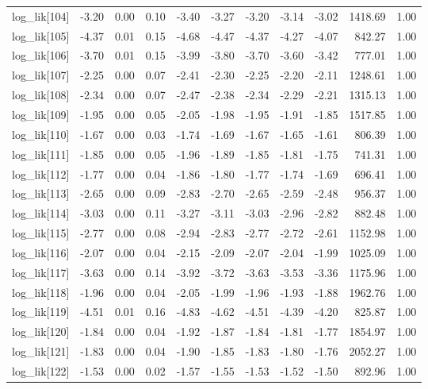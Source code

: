 \begin{table}[ht]
\begin{tabular}{rrrrrrrrrrr}
  log\_lik[104] & -3.20 & 0.00 & 0.10 & -3.40 & -3.27 & -3.20 & -3.14 & -3.02 & 1418.69 & 1.00 \\ 
  log\_lik[105] & -4.37 & 0.01 & 0.15 & -4.68 & -4.47 & -4.37 & -4.27 & -4.07 & 842.27 & 1.00 \\ 
  log\_lik[106] & -3.70 & 0.01 & 0.15 & -3.99 & -3.80 & -3.70 & -3.60 & -3.42 & 777.01 & 1.00 \\ 
  log\_lik[107] & -2.25 & 0.00 & 0.07 & -2.41 & -2.30 & -2.25 & -2.20 & -2.11 & 1248.61 & 1.00 \\ 
  log\_lik[108] & -2.34 & 0.00 & 0.07 & -2.47 & -2.38 & -2.34 & -2.29 & -2.21 & 1315.13 & 1.00 \\ 
  log\_lik[109] & -1.95 & 0.00 & 0.05 & -2.05 & -1.98 & -1.95 & -1.91 & -1.85 & 1517.85 & 1.00 \\ 
  log\_lik[110] & -1.67 & 0.00 & 0.03 & -1.74 & -1.69 & -1.67 & -1.65 & -1.61 & 806.39 & 1.00 \\ 
  log\_lik[111] & -1.85 & 0.00 & 0.05 & -1.96 & -1.89 & -1.85 & -1.81 & -1.75 & 741.31 & 1.00 \\ 
  log\_lik[112] & -1.77 & 0.00 & 0.04 & -1.86 & -1.80 & -1.77 & -1.74 & -1.69 & 696.41 & 1.00 \\ 
  log\_lik[113] & -2.65 & 0.00 & 0.09 & -2.83 & -2.70 & -2.65 & -2.59 & -2.48 & 956.37 & 1.00 \\ 
  log\_lik[114] & -3.03 & 0.00 & 0.11 & -3.27 & -3.11 & -3.03 & -2.96 & -2.82 & 882.48 & 1.00 \\ 
  log\_lik[115] & -2.77 & 0.00 & 0.08 & -2.94 & -2.83 & -2.77 & -2.72 & -2.61 & 1152.98 & 1.00 \\ 
  log\_lik[116] & -2.07 & 0.00 & 0.04 & -2.15 & -2.09 & -2.07 & -2.04 & -1.99 & 1025.09 & 1.00 \\ 
  log\_lik[117] & -3.63 & 0.00 & 0.14 & -3.92 & -3.72 & -3.63 & -3.53 & -3.36 & 1175.96 & 1.00 \\ 
  log\_lik[118] & -1.96 & 0.00 & 0.04 & -2.05 & -1.99 & -1.96 & -1.93 & -1.88 & 1962.76 & 1.00 \\ 
  log\_lik[119] & -4.51 & 0.01 & 0.16 & -4.83 & -4.62 & -4.51 & -4.39 & -4.20 & 825.87 & 1.00 \\ 
  log\_lik[120] & -1.84 & 0.00 & 0.04 & -1.92 & -1.87 & -1.84 & -1.81 & -1.77 & 1854.97 & 1.00 \\ 
  log\_lik[121] & -1.83 & 0.00 & 0.04 & -1.90 & -1.85 & -1.83 & -1.80 & -1.76 & 2052.27 & 1.00 \\ 
  log\_lik[122] & -1.53 & 0.00 & 0.02 & -1.57 & -1.55 & -1.53 & -1.52 & -1.50 & 892.96 & 1.00 \\ 

\end{tabular}
\end{table}
